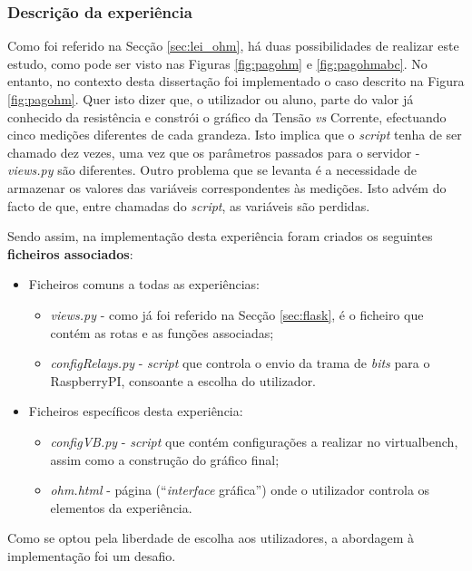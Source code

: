 \subsubsection{Descrição da experiência}
\label{sec:descricao_experiencia}
Como foi referido na Secção \ref{sec:lei_ohm}, há duas possibilidades de realizar este estudo, como pode ser visto nas Figuras \ref{fig:pagohm} e \ref{fig:pagohmabc}. No entanto, no contexto desta dissertação foi implementado o caso descrito na Figura \ref{fig:pagohm}. Quer isto dizer que, o utilizador ou aluno, parte do valor já conhecido da resistência e constrói o gráfico da Tensão \textit{vs} Corrente, efectuando cinco medições diferentes de cada grandeza. Isto implica que o \textit{script} tenha de ser chamado dez vezes, uma vez que os parâmetros passados para o servidor - \textit{views.py} são diferentes. Outro problema que se levanta é a necessidade de armazenar os valores das variáveis correspondentes às medições. Isto advém do facto de que, entre chamadas do \textit{script}, as variáveis são perdidas.

Sendo assim, na implementação desta experiência foram criados os seguintes \textbf{ficheiros associados}:
\begin{itemize}
	\item Ficheiros comuns a todas as experiências:
	      \begin{itemize}
		      \item \textit{views.py} - como já foi referido na Secção \ref{sec:flask}, é o ficheiro que contém as rotas e as funções associadas;
		      \item \textit{configRelays.py} - \textit{script} que controla o envio da trama de \textit{bits} para o \gls{RaspberryPI}, consoante a escolha do utilizador.
	      \end{itemize}
	\item Ficheiros específicos desta experiência:
	      \begin{itemize}
		      \item \textit{configVB.py} - \textit{script} que contém configurações a realizar no \acrshort{virtualbench}, assim como a construção do gráfico final;
		      \item \textit{ohm.html} - página (``\textit{interface} gráfica'') onde o utilizador controla os elementos da experiência.

	      \end{itemize}
\end{itemize}

Como se optou pela liberdade de escolha aos utilizadores, a abordagem à implementação foi um desafio.

